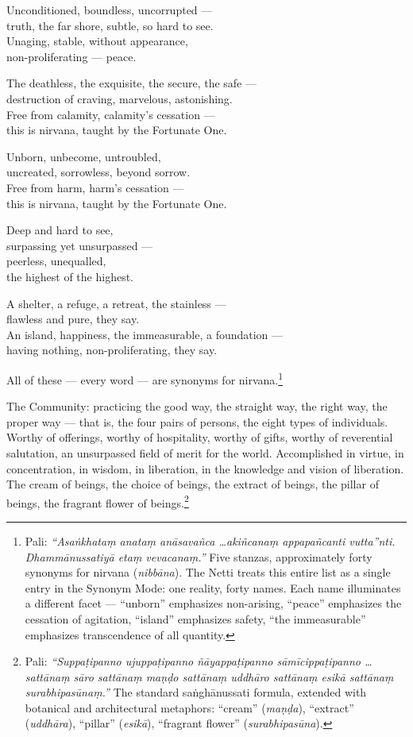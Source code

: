 \begin{versebox}
Unconditioned, boundless, uncorrupted ---\\
truth, the far shore, subtle, so hard to see.\\
Unaging, stable, without appearance,\\
non-proliferating --- peace.

The deathless, the exquisite, the secure, the safe ---\\
destruction of craving, marvelous, astonishing.\\
Free from calamity, calamity's cessation ---\\
this is nirvana, taught by the Fortunate One.

Unborn, unbecome, untroubled,\\
uncreated, sorrowless, beyond sorrow.\\
Free from harm, harm's cessation ---\\
this is nirvana, taught by the Fortunate One.

Deep and hard to see,\\
surpassing yet unsurpassed ---\\
peerless, unequalled,\\
the highest of the highest.

A shelter, a refuge, a retreat, the stainless ---\\
flawless and pure, they say.\\
An island, happiness, the immeasurable, a foundation ---\\
having nothing, non-proliferating, they say.
\end{versebox}

All of these --- every word --- are synonyms for nirvana.\footnote{Pali: \textit{``Asaṅkhataṃ anataṃ anāsavañca \ldots akiñcanaṃ appapañcanti vutta''nti. Dhammānussatiyā etaṃ vevacanaṃ.''} Five stanzas, approximately forty synonyms for nirvana (\textit{nibbāna}). The Netti treats this entire list as a single entry in the Synonym Mode: one reality, forty names. Each name illuminates a different facet --- ``unborn'' emphasizes non-arising, ``peace'' emphasizes the cessation of agitation, ``island'' emphasizes safety, ``the immeasurable'' emphasizes transcendence of all quantity.}

The Community: practicing the good way, the straight way, the right way, the proper way --- that is, the four pairs of persons, the eight types of individuals. Worthy of offerings, worthy of hospitality, worthy of gifts, worthy of reverential salutation, an unsurpassed field of merit for the world. Accomplished in virtue, in concentration, in wisdom, in liberation, in the knowledge and vision of liberation. The cream of beings, the choice of beings, the extract of beings, the pillar of beings, the fragrant flower of beings.\footnote{Pali: \textit{``Suppaṭipanno ujuppaṭipanno ñāyappaṭipanno sāmīcippaṭipanno \ldots sattānaṃ sāro sattānaṃ maṇḍo sattānaṃ uddhāro sattānaṃ esikā sattānaṃ surabhipasūnaṃ.''} The standard saṅghānussati formula, extended with botanical and architectural metaphors: ``cream'' (\textit{maṇḍa}), ``extract'' (\textit{uddhāra}), ``pillar'' (\textit{esikā}), ``fragrant flower'' (\textit{surabhipasūna}).}

